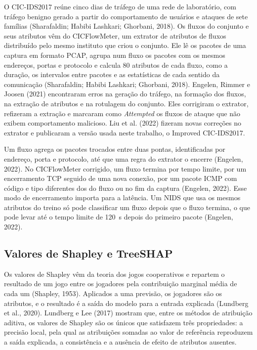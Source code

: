 \documentclass[
  article,
  12pt,
  oneside,
  a4paper,
  english,
  brazil
]{abntex2}
\begin{document}
O CIC-IDS2017 reúne cinco dias de tráfego de uma rede de laboratório, com tráfego benigno gerado a
partir do comportamento de usuários e ataques de sete famílias (Sharafaldin; Habibi Lashkari; Ghorbani,
2018). Os fluxos do conjunto e seus atributos vêm do CICFlowMeter, um extrator de atributos de
fluxos distribuído pelo mesmo instituto que criou o conjunto. Ele lê os pacotes de uma captura em
formato PCAP, agrupa num fluxo os pacotes com os mesmos endereços, portas e protocolo e calcula 80
atributos de cada fluxo, como a duração, os intervalos entre pacotes e as estatísticas de cada
sentido da comunicação (Sharafaldin; Habibi Lashkari; Ghorbani, 2018). Engelen, Rimmer e Joosen (2021) encontraram
erros na geração do tráfego, na formação dos fluxos, na extração de atributos e na rotulagem do
conjunto. Eles corrigiram o extrator, refizeram a extração e marcaram como \emph{Attempted} os
fluxos de ataque que não exibem comportamento malicioso. Liu et al. (2022) fizeram novas correções
no extrator e publicaram a versão usada neste trabalho, o Improved CIC-IDS2017.

Um fluxo agrega os pacotes trocados entre duas pontas, identificadas por endereço, porta e
protocolo, até que uma regra do extrator o encerre (Engelen, 2022). No CICFlowMeter corrigido, um fluxo termina por
tempo limite, por um encerramento TCP seguido de uma nova conexão, por um pacote ICMP com código e
tipo diferentes dos do fluxo ou no fim da captura (Engelen, 2022). Esse modo de
encerramento importa para a latência. Um NIDS que usa os mesmos atributos do treino só pode
classificar um fluxo depois que o fluxo termina, o que pode levar até o tempo limite de 120~s
depois do primeiro pacote (Engelen, 2022).

\subsection{Valores de Shapley e TreeSHAP}

Os valores de Shapley vêm da teoria dos jogos cooperativos e repartem o resultado de um jogo entre
os jogadores pela contribuição marginal média de cada um (Shapley, 1953). Aplicados a uma previsão, os jogadores são
os atributos, e o resultado é a saída do modelo para a entrada explicada (Lundberg et al., 2020). Lundberg e Lee
(2017) mostram que, entre os métodos de atribuição aditiva, os valores de Shapley são
os únicos que satisfazem três propriedades: a precisão local, pela qual as atribuições somadas ao
valor de referência reproduzem a saída explicada, a consistência e a ausência de efeito de atributos
ausentes.
\end{document}

